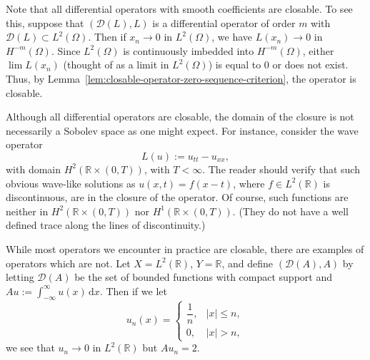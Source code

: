 \begin{Example}
\label{ex:differential-operators-closable-wave-domain}
Note that all differential operators with smooth coefficients are closable. To see this, suppose that $(\mathcal{D}(L),L)$ is a differential operator of order $m$ with $\mathcal{D}(L)\subset L^2(\Omega)$. Then if $x_n\to0$ in $L^2(\Omega)$, we have $L(x_n)\to0$ in $H^{-m}(\Omega)$. Since $L^2(\Omega)$ is continuously imbedded into $H^{-m}(\Omega)$, either $\lim L(x_n)$ (thought of as a limit in $L^2(\Omega)$) is equal to $0$ or does not exist. Thus, by Lemma~\ref{lem:closable-operator-zero-sequence-criterion}, the operator is closable.

Although all differential operators are closable, the domain of the closure is not necessarily a Sobolev space as one might expect. For instance, consider the wave operator
\begin{equation}\label{eq:wave-operator-closable-nonsobolev-example}
L(u):=u_{tt}-u_{xx},
\end{equation}
with domain $H^2(\mathbb{R}\times(0,T))$, with $T<\infty$. The reader should verify that such obvious wave-like solutions as $u(x,t)=f(x-t)$, where $f\in L^2(\mathbb{R})$ is discontinuous, are in the closure of the operator. Of course, such functions are neither in $H^2(\mathbb{R}\times(0,T))$ nor $H^1(\mathbb{R}\times(0,T))$. (They do not have a well defined trace along the lines of discontinuity.)
\end{Example}

\begin{Example}
\label{ex:nonclosable-integral-operator}
While most operators we encounter in practice are closable, there are examples of operators which are not. Let $X=L^2(\mathbb{R})$, $Y=\mathbb{R}$, and define $(\mathcal{D}(A),A)$ by letting $\mathcal{D}(A)$ be the set of bounded functions with compact support and $Au:=\int_{-\infty}^\infty u(x)\,\mathrm{d}x$. Then if we let
\begin{equation}\label{eq:nonclosable-integral-operator-sequence}
u_n(x)=\begin{cases}\dfrac{1}{n},&|x|\leq n,\\0,&|x|>n,\end{cases}
\end{equation}
we see that $u_n\to0$ in $L^2(\mathbb{R})$ but $Au_n=2$.
\end{Example}
